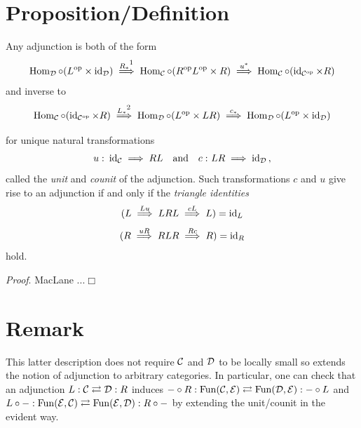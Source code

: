     \section{Proposition/Definition}
        Any adjunction is both of the form
        \begin{equation*}
            \Hom_{\Dd} \circ (L^{\op} \times \id_{\Dd}) \overset{R_*\footnotemark}{\implies} \Hom_{\Cc} \circ (R^{\op}L^{\op} \times R) \overset{u^*}{\implies} \Hom_{\Cc} \circ (\id_{\Cc^{\op}} \times R)
        \end{equation*}
        and inverse to
        \begin{equation*}
            \Hom_{\Cc} \circ (\id_{\Cc^{\op}} \times R) \overset{L_*\footnotemark}{\implies} \Hom_{\Dd} \circ (L^{\op} \times LR) \overset{c_*}{\implies} \Hom_{\Dd} \circ (L^{\op} \times \id_{\Dd})
        \end{equation*}
        \addtocounter{footnote}{-2}
        for unique natural transformations
        \begin{equation*}
            u \,\colon \operatorname{id}_{\mathcal{C}} \implies RL \quad \text{and} \quad c \,\colon LR \implies \operatorname{id}_{\mathcal{D}} \,,
        \end{equation*}
        called the \emph{unit} and \emph{counit} of the adjunction.
        Such transformations $c$ and $u$ give rise to an adjunction if and only if the \emph{triangle identities}
        \begin{equation*}
            (L \overset{Lu}{\implies} LRL \overset{cL}{\implies} L) = \operatorname{id}_L
        \end{equation*}
        \begin{equation*}
            (R \overset{uR}{\implies} RLR \overset{Rc}{\implies} R) = \operatorname{id}_R
        \end{equation*}
        hold.
        \smallskip
        
        \emph{Proof}. MacLane ...\hfill\(\Box\)
    \section{Remark}\label{chI-23}
        This latter description does not require $\mathcal{C}$ and $\mathcal{D}$ to be locally small so extends the notion of adjunction to arbitrary categories. In particular, one can check that an adjunction $L : \mathcal{C} \rightleftarrows \mathcal{D} : R$ induces $- \circ R : \operatorname{Fun}(\mathcal{C}, \mathcal{E}) \rightleftarrows \operatorname{Fun}(\mathcal{D}, \mathcal{E}) : - \circ L$ and $L \circ - : \operatorname{Fun}(\mathcal{E}, \mathcal{C}) \rightleftarrows \operatorname{Fun}(\mathcal{E}, \mathcal{D}) : R \circ -$ by extending the unit/counit in the evident way.
